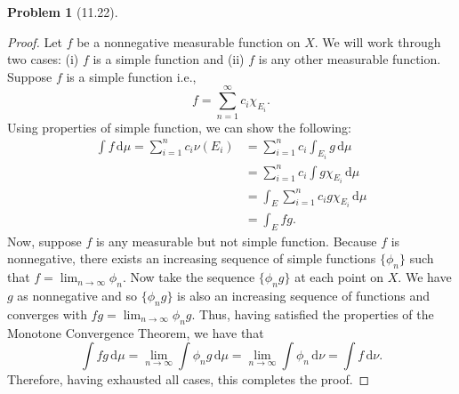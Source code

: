 \documentclass[12pt]{article}
\newcommand{\dif}{\, \mathrm{d}}
\theoremstyle{definition}
\newtheorem{problem}{Problem}
\begin{document}
\begin{problem}[11.22]
\begin{enumerate}[label = (\alph{*})]
            \begin{proof}
                Let \(f \) be a nonnegative measurable function on \( X \).
                We will work through two cases: (i) \( f \) is a simple function and (ii) \( f \) is any other measurable function. 
                Suppose \( f \) is a simple function i.e., 
                    \[
                        f = \sum_{n=1}^{\infty}  c_i \chi_{E_{i}}.
                    \]
                Using properties of simple function, we can show the following:
                    \begin{align*}
                        \int f \dif \mu = \sum_{i=1}^{n} c_i \nu(E_i) &= \sum_{i=1}^{n} c_i \int_{E_i} g \dif \mu  \\
                        &= \sum_{i=1}^{n} c_i \int g \chi_{E_{i}} \dif \mu \\
                        &= \int_{E} \sum_{i=1}^{n} c_i  g \chi_{E_{i}} \dif \mu \\
                        &= \int_{E} fg.
                    \end{align*}
                Now, suppose \( f \) is any measurable but not simple function. 
                Because \( f \) is nonnegative, there exists an increasing sequence of simple functions \( \{\phi_n\}\) such that \( \displaystyle f = \lim_{n \to \infty} \phi_n \).
                Now take the sequence \( \{\phi_n g\} \) at each point on \( X \).
                We have \( g \) as nonnegative and so \( \{\phi_n g \} \) is also an increasing sequence of functions and converges with \( \displaystyle fg = \lim_{n \to \infty} \phi_n g \).
                Thus, having satisfied the properties of the Monotone Convergence Theorem, we have that
                    \[
                        \int fg \dif \mu = \lim_{n \to \infty} \int \phi_n g \dif \mu = \lim_{n \to \infty} \int \phi_n \dif \nu = \int f \dif \nu. 
                    \]
                Therefore, having exhausted all cases, this completes the proof. 
            \end{proof}
    \end{enumerate}


\end{problem}
\end{document}
